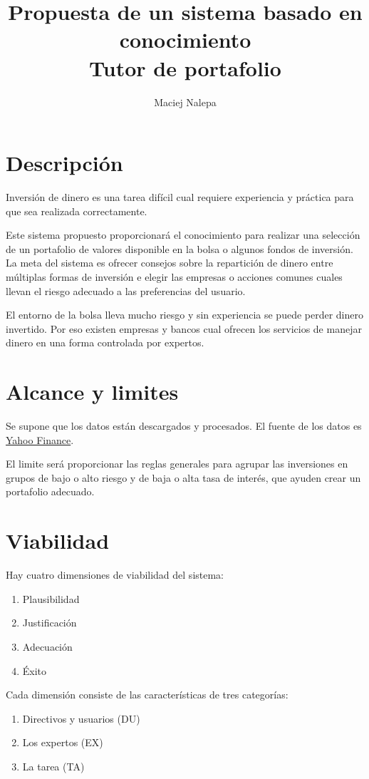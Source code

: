 \documentclass[a4paper,12pt]{article}
\title{Propuesta de un sistema basado en conocimiento\\ \normalsize{Tutor de portafolio}}
\author{Maciej Nalepa}
\begin{document}
\maketitle

\section{Descripción}
Inversión de dinero es una tarea difícil cual requiere experiencia y práctica para que sea realizada correctamente.

Este sistema propuesto proporcionará el conocimiento para realizar una selección de un portafolio de valores disponible en la bolsa o algunos fondos de inversión. La meta del sistema es ofrecer consejos sobre la repartición de dinero entre múltiplas formas de inversión e elegir las empresas o acciones comunes cuales llevan el riesgo adecuado a las preferencias del usuario.

El entorno de la bolsa lleva mucho riesgo y sin experiencia se puede perder dinero invertido. Por eso existen empresas y bancos cual ofrecen los servicios de manejar dinero en una forma controlada por expertos.

\section{Alcance y limites}
Se supone que los datos están descargados y procesados. El fuente de los datos es \href{https://es.finance.yahoo.com/}{Yahoo Finance}.

El limite será proporcionar las reglas generales para agrupar las inversiones en grupos de bajo o alto riesgo y de baja o alta tasa de interés, que ayuden crear un portafolio adecuado.

\section{Viabilidad}

\noindent Hay cuatro dimensiones de viabilidad del sistema:
\begin{enumerate}
	\item Plausibilidad
	\item Justificación
	\item Adecuación
	\item Éxito
\end{enumerate}

\noindent Cada dimensión consiste de las características de tres categorías:
\begin{enumerate}
	\item Directivos y usuarios (DU)
	\item Los expertos (EX)
	\item La tarea (TA)
\end{enumerate}
\end{document}
